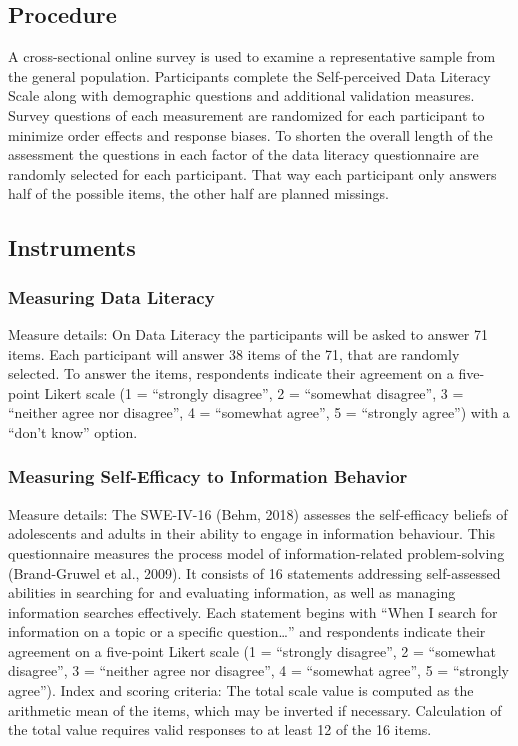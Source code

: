 \documentclass[
  12pt,
  a4paper,
  twoside]{article}
\begin{document}
\subsection{Procedure}\label{procedure}

A cross-sectional online survey is used to examine a representative sample from the general population. Participants complete the Self-perceived Data Literacy Scale along with demographic questions and additional validation measures. Survey questions of each measurement are randomized for each participant to minimize order effects and response biases. To shorten the overall length of the assessment the questions in each factor of the data literacy questionnaire are randomly selected for each participant. That way each participant only answers half of the possible items, the other half are planned missings.

\subsection{Instruments}\label{instruments}

\subsubsection{Measuring Data Literacy}\label{measuring-data-literacy}

Measure details: On Data Literacy the participants will be asked to answer 71
items. Each participant will answer 38 items of the 71, that are randomly selected.
To answer the items, respondents indicate their agreement on a five-point Likert
scale (1 = ``strongly disagree'', 2 = ``somewhat disagree'', 3 = ``neither agree nor
disagree'', 4 = ``somewhat agree'', 5 = ``strongly agree'') with a ``don't know''
option.

\subsubsection{Measuring Self-Efficacy to Information Behavior}\label{measuring-self-efficacy-to-information-behavior}

Measure details: The SWE-IV-16 (Behm, 2018) assesses the self-efficacy beliefs
of adolescents and adults in their ability to engage in information behaviour. This
questionnaire measures the process model of information-related problem-solving
(Brand-Gruwel et al., 2009). It consists of 16 statements addressing self-assessed
abilities in searching for and evaluating information, as well as managing
information searches effectively. Each statement begins with ``When I search for
information on a topic or a specific question\ldots{}'' and respondents indicate their
agreement on a five-point Likert scale (1 = ``strongly disagree'', 2 = ``somewhat
disagree'', 3 = ``neither agree nor disagree'', 4 = ``somewhat agree'', 5 = ``strongly
agree'').
Index and scoring criteria: The total scale value is computed as the arithmetic
mean of the items, which may be inverted if necessary. Calculation of the total value
requires valid responses to at least 12 of the 16 items.
\end{document}
